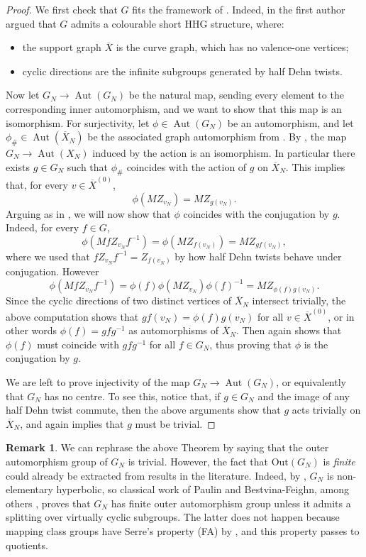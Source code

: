\documentclass[svgnames]{amsart}
\theoremstyle{plain}
\theoremstyle{definition}
\newtheorem{rem}[thm]{Remark}
\newcommand{\Aut}[1]{\operatorname{Aut}\left(#1\right)}
\newcommand{\ov}[1]{\overline{#1}}
\begin{document}
\begin{proof}
    We first check that $G$ fits the framework of . Indeed, in \cite[Section 2.3.1]{short_HHG:I} the first author argued that $G$ admits a colourable short HHG structure, where:
    \begin{itemize}
    \item the support graph $\ov X$ is the curve graph, which has no valence-one vertices;
    \item cyclic directions are the infinite subgroups generated by half Dehn twists. 
    \end{itemize}
    Now let $G_N\to \Aut{G_N}$ be the natural map, sending every element to the corresponding inner automorphism, and we want to show that this map is an isomorphism. For surjectivity, let $\phi\in \Aut{G_N}$ be an automorphism, and let $\phi_{\#}\in \Aut{\ov X_N}$ be the associated graph automorphism from . By \cite[Theorem 5.11]{rigidity_mcg_mod_dt}, the map $G_N\to \Aut{X_N}$ induced by the action is an isomorphism. In particular there exists $g\in G_N$ such that $\phi_{\#}$ coincides with the action of $g$ on $\ov X_N$. This implies that, for every $v\in \ov X^{(0)}$, $$\phi(MZ_{v_N})=MZ_{g(v_N)}.$$
    Arguing as in \cite[Section 3]{Ivanov:autC}, we will now show that $\phi$ coincides with the conjugation by $g$. Indeed, for every $f\in G$,
    $$\phi(MfZ_{v_N}f^{-1})=\phi(MZ_{f(v_N)})=MZ_{gf(v_N)},$$
    where we used that $fZ_{v_N}f^{-1}=Z_{f(v_N)}$ by how half Dehn twists behave under conjugation. However
    $$\phi(MfZ_{v_N}f^{-1})=\phi(f)\phi(MZ_{v_N})\phi(f)^{-1}=MZ_{\phi(f)g(v_N)}.$$
    Since the cyclic directions of two distinct vertices of $\ov X_N$ intersect trivially, the above computation shows that $gf(v_N)=\phi(f)g(v_N)$ for all $v\in \ov X^{(0)}$, or in other words $\phi(f)=gfg^{-1}$ as automorphisms of $\ov X_N$. Then again \cite[Theorem 5.11]{rigidity_mcg_mod_dt} shows that $\phi(f)$ must coincide with $gfg^{-1}$ for all $f\in G_N$, thus proving that $\phi$ is the conjugation by $g$.

    We are left to prove injectivity of the map $G_N\to \Aut{G_N}$, or equivalently that $G_N$ has no centre. To see this, notice that, if $g\in G_N$ and the image of any half Dehn twist commute, then the above arguments show that $g$ acts trivially on $\ov X_N$, and again \cite[Theorem 5.11]{rigidity_mcg_mod_dt} implies that $g$ must be trivial.
\end{proof}


\begin{rem}\label{rem:out_is_finite} We can rephrase the above Theorem by saying that the outer automorphism group of $G_N$ is trivial. However, the fact that $\text{Out}(G_N)$ is \emph{finite} could already be extracted from results in the literature. Indeed, by \cite[Theorem 5.8.(2)]{dfdt}, $G_N$ is non-elementary hyperbolic, so classical work of Paulin and Bestvina-Feighn, among others \cite{Paulin, Bestvina-Feighn}, proves that $G_N$ has finite outer automorphism group unless it admits a splitting over virtually cyclic subgroups. The latter does not happen because mapping class groups have Serre's property (FA) by \cite{FA_MCG}, and this property passes to quotients. 
\end{rem}
\end{document}
